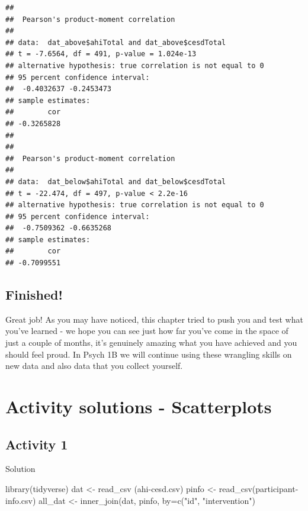 \documentclass[
  oneside]{book}
\newenvironment{Shaded}{\begin{snugshade}}{\end{snugshade}}
\newcommand{\AttributeTok}[1]{\textcolor[rgb]{0.77,0.63,0.00}{#1}}
\newcommand{\FunctionTok}[1]{\textcolor[rgb]{0.00,0.00,0.00}{#1}}
\newcommand{\NormalTok}[1]{#1}
\newcommand{\OtherTok}[1]{\textcolor[rgb]{0.56,0.35,0.01}{#1}}
\newcommand{\StringTok}[1]{\textcolor[rgb]{0.31,0.60,0.02}{#1}}
\begin{document}
\begin{verbatim}
## 
##  Pearson's product-moment correlation
## 
## data:  dat_above$ahiTotal and dat_above$cesdTotal
## t = -7.6564, df = 491, p-value = 1.024e-13
## alternative hypothesis: true correlation is not equal to 0
## 95 percent confidence interval:
##  -0.4032637 -0.2453473
## sample estimates:
##        cor 
## -0.3265828 
## 
## 
##  Pearson's product-moment correlation
## 
## data:  dat_below$ahiTotal and dat_below$cesdTotal
## t = -22.474, df = 497, p-value < 2.2e-16
## alternative hypothesis: true correlation is not equal to 0
## 95 percent confidence interval:
##  -0.7509362 -0.6635268
## sample estimates:
##        cor 
## -0.7099551
\end{verbatim}

\hypertarget{finished-5}{%
\subsection{Finished!}\label{finished-5}}

Great job! As you may have noticed, this chapter tried to push you and test what you've learned - we hope you can see just how far you've come in the space of just a couple of months, it's genuinely amazing what you have achieved and you should feel proud. In Psych 1B we will continue using these wrangling skills on new data and also data that you collect yourself.

\hypertarget{activity-solutions---scatterplots}{%
\section{Activity solutions - Scatterplots}\label{activity-solutions---scatterplots}}

\hypertarget{activity-1-2}{%
\subsection{Activity 1}\label{activity-1-2}}

Solution

\begin{Shaded}
\begin{Highlighting}[]
\FunctionTok{library}\NormalTok{(tidyverse)}
\NormalTok{dat }\OtherTok{\textless{}{-}} \FunctionTok{read\_csv}\NormalTok{ (}\StringTok{\textquotesingle{}ahi{-}cesd.csv\textquotesingle{}}\NormalTok{)}
\NormalTok{pinfo }\OtherTok{\textless{}{-}} \FunctionTok{read\_csv}\NormalTok{(}\StringTok{\textquotesingle{}participant{-}info.csv\textquotesingle{}}\NormalTok{)}
\NormalTok{all\_dat }\OtherTok{\textless{}{-}} \FunctionTok{inner\_join}\NormalTok{(dat, pinfo, }\AttributeTok{by=}\FunctionTok{c}\NormalTok{(}\StringTok{"id"}\NormalTok{, }\StringTok{"intervention"}\NormalTok{)}
\end{Highlighting}
\end{Shaded}
\end{document}
